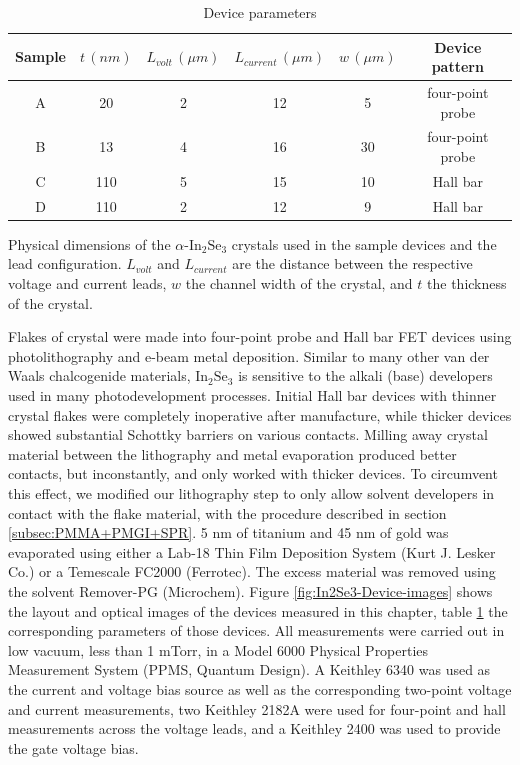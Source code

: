 \noindent 
\begin{table}
\begin{centering}
\begin{tabular}{|c|c|c|c|c|c|}
\hline 
Sample & $t\,(nm)$ & $L_{volt}\,\left(\mu m\right)$ & $L_{current}\,\left(\mu m\right)$ & $w\,\left(\mu m\right)$ & Device pattern\tabularnewline
\hline 
\hline 
A & 20 & 2 & 12 & 5 & four-point probe\tabularnewline
\hline 
B & 13 & 4 & 16 & 30 & four-point probe\tabularnewline
\hline 
C & 110 & 5 & 15 & 10 & Hall bar\tabularnewline
\hline 
D & 110 & 2 & 12 & 9 & Hall bar\tabularnewline
\hline 
\end{tabular}
\par\end{centering}
\caption{Device parameters\label{tab:In2Se3-Device-parameters}}

Physical dimensions of the $\ensuremath{\alpha}\textrm{-In}_{2}\textrm{Se}_{3}$
crystals used in the sample devices and the lead configuration. $L_{volt}$
and $L_{current}$ are the distance between the respective voltage
and current leads, $w$ the channel width of the crystal, and $t$
the thickness of the crystal. 
\end{table}

Flakes of crystal were made into four-point probe and Hall bar FET
devices using photolithography and e-beam metal deposition. Similar
to many other van der Waals chalcogenide materials, $\textrm{In}_{2}\textrm{Se}_{3}$
is sensitive to the alkali (base) developers used in many photodevelopment
processes.\citep{choi2011su8,choi2008protective} Initial Hall bar
devices with thinner crystal flakes were completely inoperative after
manufacture, while thicker devices showed substantial Schottky barriers
on various contacts. Milling away crystal material between the lithography
and metal evaporation produced better contacts, but inconstantly,
and only worked with thicker devices. To circumvent this effect, we
modified our lithography step to only allow solvent developers in
contact with the flake material, with the procedure described in section
\ref{subsec:PMMA+PMGI+SPR}. 5 nm of titanium and 45 nm of gold was
evaporated using either a Lab-18 Thin Film Deposition System (Kurt
J. Lesker Co.) or a Temescale FC2000 (Ferrotec). The excess material
was removed using the solvent Remover-PG (Microchem). Figure \ref{fig:In2Se3-Device-images}
shows the layout and optical images of the devices measured in this
chapter, table \ref{tab:In2Se3-Device-parameters} the corresponding
parameters of those devices. All measurements were carried out in
low vacuum, less than 1 mTorr, in a Model 6000 Physical Properties
Measurement System (PPMS, Quantum Design). A Keithley 6340 was used
as the current and voltage bias source as well as the corresponding
two-point voltage and current measurements, two Keithley 2182A were
used for four-point and hall measurements across the voltage leads,
and a Keithley 2400 was used to provide the gate voltage bias.

